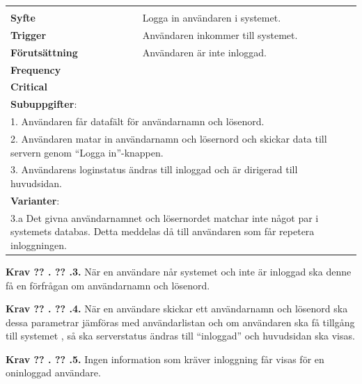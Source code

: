 \documentclass[a4paper]{article}
\newcommand\getcurrentref[1]{%
 \ifnumequal{\value{#1}}{0}
  {??}
  {\the\value{#1}}%
}
\newcommand\requirement[2]{
	\numberedrow{Krav}{#1}{#2}
}
\newcommand\scenario[2] {
	\numberedrow{Scenario}{#1}{#2}
}
\newcommand\numberedrow[3]{
	\noindent
	\textbf{#1 \getcurrentref{section}.\getcurrentref{subsection}.#2.} #3
	
}
\begin{document}
\begin{table}[H]
\begin{tabular}{ | p{2cm} p{11cm} | }
   
        \hline
	\multicolumn{2}{|p{13cm}|}{ \indent\scenario{1}} \\
    \textbf{Syfte} & Logga in användaren i systemet.\\
    \textbf{Trigger} & Användaren inkommer till systemet. \\
    \textbf{Förutsättning} & Användaren är inte inloggad.\\
    \textbf{Frequency} & \\
    \textbf{Critical} & \\
    \hline

	\multicolumn{2}{|p{13cm}|}{ \textbf{Subuppgifter}:} \\

	\multicolumn{2}{|p{13cm}|}{ 1. Användaren får datafält för användarnamn och lösenord.}\\
	\multicolumn{2}{|p{13cm}|}{ 2. Användaren matar in användarnamn och lösernord och skickar data till servern genom ``Logga in''-knappen.} \\	
	\multicolumn{2}{|p{13cm}|}{ 3. Användarens loginstatus ändras till inloggad och är dirigerad till huvudsidan. }\\ \hline
    \multicolumn{2}{|p{13cm}|}{ \textbf{Varianter}: }\\
	\multicolumn{2}{|p{13cm}|}{ 3.a Det givna användarnamnet och lösernordet matchar inte något par i systemets databas. Detta meddelas då till användaren som får repetera inloggningen.}\\
	    \hline


\end{tabular}
\end{table}

\requirement{3}{När en användare når systemet och inte är inloggad ska denne få en förfrågan om användarnamn och lösenord.}
\requirement{4}{När en användare skickar ett användarnamn och lösenord ska dessa parametrar jämföras med användarlistan och om användaren ska få tillgång till systemet , så ska serverstatus ändras till ``inloggad'' och huvudsidan ska visas.}
\requirement{5}{Ingen information som kräver inloggning får visas för en oninloggad användare.}
\end{document}
